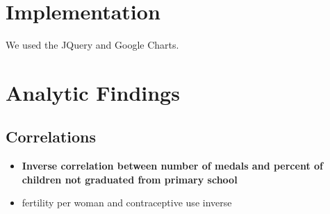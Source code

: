 \documentclass[a4paper]{article}
\begin{document}
\section{Implementation}
We used the JQuery and Google Charts.


\section{Analytic Findings}
\subsection{Correlations}
\begin{itemize}
\item{\textbf{Inverse correlation between number of medals and percent of children not graduated from primary school}}
\item{fertility per woman and contraceptive use inverse}
\end{itemize}
\end{document}
